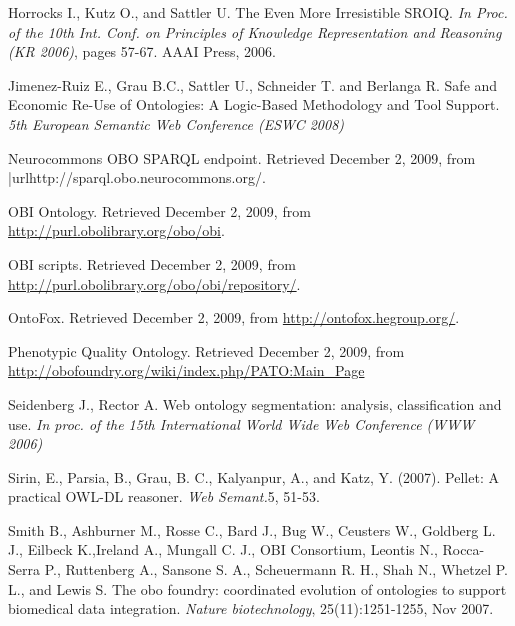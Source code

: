 \documentclass[jou]{ao2e}%
\begin{document}
\begin{thebibliography}{}
 Horrocks I., Kutz O., and Sattler U. The Even More Irresistible SROIQ. \textit{In Proc. of the 10th Int. Conf. on Principles of Knowledge Representation and Reasoning (KR 2006)}, pages 57-67. AAAI Press, 2006.

 Jimenez-Ruiz E., Grau B.C., Sattler U., Schneider T. and Berlanga R. Safe and Economic Re-Use of Ontologies: A Logic-Based Methodology and Tool Support. \textit{5th European Semantic Web Conference (ESWC 2008)} 

 Neurocommons OBO SPARQL endpoint. Retrieved December 2, 2009, from |url{http://sparql.obo.neurocommons.org/}.

 OBI Ontology. Retrieved December 2, 2009, from \url{http://purl.obolibrary.org/obo/obi}.

 OBI scripts. Retrieved December 2, 2009, from \url{http://purl.obolibrary.org/obo/obi/repository/}.

 OntoFox. Retrieved December 2, 2009, from \url{http://ontofox.hegroup.org/}.

 Phenotypic Quality Ontology. Retrieved December 2, 2009, from \url{http://obofoundry.org/wiki/index.php/PATO:Main_Page}

 Seidenberg J., Rector A. Web ontology segmentation: analysis, classification and use. \textit{In proc. of the 15th International World Wide Web Conference (WWW 2006)}

 Sirin, E., Parsia, B., Grau, B. C., Kalyanpur, A., and Katz, Y. (2007). Pellet: A practical OWL-DL reasoner. \textit{Web Semant.}5, 51-53. 
 
  Smith B., Ashburner M., Rosse C., Bard J., Bug W., Ceusters W., Goldberg L. J., Eilbeck K.,Ireland A., Mungall C. J., OBI Consortium, Leontis N., Rocca-Serra P., Ruttenberg A., Sansone S. A., Scheuermann R. H., Shah N., Whetzel P. L., and Lewis S. The obo foundry: coordinated evolution of ontologies to support biomedical data integration. \textit{Nature biotechnology}, 25(11):1251-1255, Nov 2007. 
 

\end{thebibliography}
\end{document}
